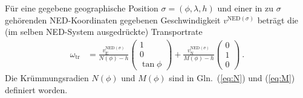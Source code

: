 \documentclass[10pt,a4paper]{article}
\begin{document}
Für eine gegebene geographische Position $\sigma=(\phi,\lambda,h)$ und einer in zu $\sigma$ gehörenden NED-Koordinaten gegebenen Geschwindigkeit
$v^{\mathrm{NED}(\sigma)}$ beträgt die (im selben NED-System ausgedrückte) Transportrate
\begin{align}
	\omega_{\mathrm{tr}}
	&=         
	\frac{v_{\mathrm{E}}^{\mathrm{NED}(\sigma)}}
         {N(\phi) - h}
	\begin{pmatrix}
		1 \\ 0 \\ \tan\phi
	\end{pmatrix}
	+
	\frac{v_{\mathrm{N}}^{\mathrm{NED}(\sigma)}}
         {M(\phi) - h}
	\begin{pmatrix}
		0 \\ 1 \\ 0
	\end{pmatrix}    	
	\ .
\end{align}
Die Krümmungsradien $N(\phi)$ und $M(\phi)$ sind in Gln.~(\ref{eq:N}) und (\ref{eq:M}) definiert worden.
\end{document}
